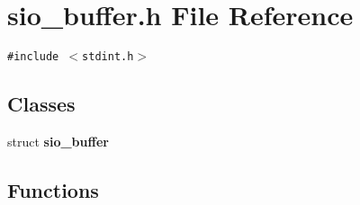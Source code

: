 \section{sio\_\-buffer.h File Reference}
\label{sio__buffer_8h}
{\tt \#include $<$stdint.h$>$}\par
\subsection*{Classes}
\begin{CompactItemize}
\item 
struct {\bf sio\_\-buffer}
\end{CompactItemize}
\subsection*{Functions}
